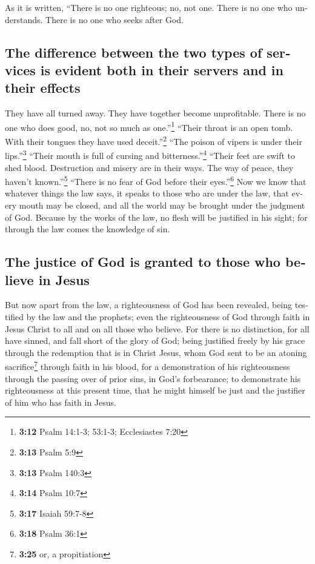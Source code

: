 \begin{paracol}{2}
\begin{otherlanguage}{english}
 As it is written, ``There is no one righteous; no, not
one.  There is no one who understands. There is no one
who seeks after God.

\hypertarget{the-difference-between-the-two-types-of-services-is-evident-both-in-their-servers-and-in-their-effects}{%
\subsection{The difference between the two types of services is evident
both in their servers and in their
effects}\label{the-difference-between-the-two-types-of-services-is-evident-both-in-their-servers-and-in-their-effects}}

 They have all turned away. They have together become
unprofitable. There is no one who does good, no, not so much as
one.''\footnote{\textbf{3:12} Psalm 14:1-3; 53:1-3; Ecclesiastes 7:20}
 ``Their throat is an open tomb. With their tongues they
have used deceit.''\footnote{\textbf{3:13} Psalm 5:9} ``The poison of
vipers is under their lips.''\footnote{\textbf{3:13} Psalm 140:3}
 ``Their mouth is full of cursing and
bitterness.''\footnote{\textbf{3:14} Psalm 10:7}  ``Their
feet are swift to shed blood.  Destruction and misery are
in their ways.  The way of peace, they haven't
known.''\footnote{\textbf{3:17} Isaiah 59:7-8}  ``There
is no fear of God before their eyes.''\footnote{\textbf{3:18} Psalm 36:1}
 Now we know that whatever things the law says, it speaks
to those who are under the law, that every mouth may be closed, and all
the world may be brought under the judgment of God. 
Because by the works of the law, no flesh will be justified in his
sight; for through the law comes the knowledge of sin.

\hypertarget{the-justice-of-god-is-granted-to-those-who-believe-in-jesus}{%
\subsection{The justice of God is granted to those who believe in
Jesus}\label{the-justice-of-god-is-granted-to-those-who-believe-in-jesus}}

 But now apart from the law, a righteousness of God has
been revealed, being testified by the law and the prophets;
 even the righteousness of God through faith in Jesus
Christ to all and on all those who believe. For there is no distinction,
 for all have sinned, and fall short of the glory of God;
 being justified freely by his grace through the
redemption that is in Christ Jesus,  whom God sent to be
an atoning sacrifice\footnote{\textbf{3:25} or, a propitiation} through
faith in his blood, for a demonstration of his righteousness through the
passing over of prior sins, in God's forbearance;  to
demonstrate his righteousness at this present time, that he might
himself be just and the justifier of him who has faith in Jesus.


\end{otherlanguage}
\end{paracol}
